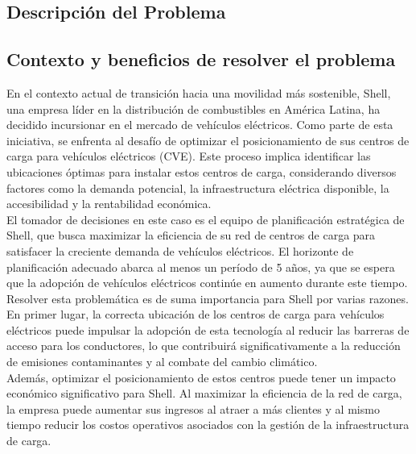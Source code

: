 \documentclass[letterpaper]{article}
\begin{document}
	\newpage
	\begin{flushleft}
		\justifying
		\section{Descripción del Problema}
		\subsection{Contexto y beneficios de resolver el problema}
		
En el contexto actual de transición hacia una movilidad más sostenible, 
Shell, una empresa líder en la distribución de combustibles en América Latina, ha decidido incursionar en el mercado de vehículos eléctricos. 
Como parte de esta iniciativa, se enfrenta al desafío de optimizar el posicionamiento de sus centros de carga para vehículos eléctricos (CVE). 
Este proceso implica identificar las ubicaciones óptimas para instalar estos centros de carga, 
considerando diversos factores como la demanda potencial, la infraestructura eléctrica disponible, la accesibilidad y la rentabilidad económica.\\

El tomador de decisiones en este caso es el equipo de planificación estratégica de Shell, 
que busca maximizar la eficiencia de su red de centros de carga para satisfacer la creciente demanda de vehículos eléctricos. 
El horizonte de planificación adecuado abarca al menos un período de 5 años, ya que se espera que la adopción de vehículos eléctricos continúe en aumento durante este tiempo.\\ 

Resolver esta problemática es de suma importancia para Shell por varias razones. 
En primer lugar, la correcta ubicación de los centros de carga para vehículos eléctricos puede impulsar la adopción de esta tecnología al reducir las barreras de acceso para los conductores, 
lo que contribuirá significativamente a la reducción de emisiones contaminantes y al combate del cambio climático. \\

Además, optimizar el posicionamiento de estos centros puede tener un impacto económico significativo para Shell. Al maximizar la eficiencia de la red de carga, la empresa puede aumentar sus ingresos al atraer a más clientes y al mismo tiempo reducir los costos operativos asociados con la gestión de la infraestructura de carga.


\end{flushleft}
\end{document}
